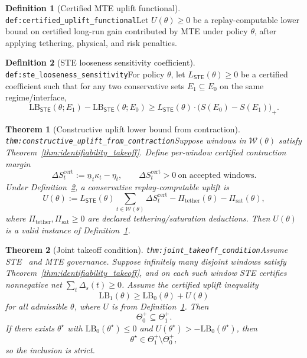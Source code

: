 \documentclass[11pt]{article}
\theoremstyle{definition}
\newtheorem{definition}{Definition}
\theoremstyle{plain}
\newtheorem{theorem}{Theorem}
\newcommand{\STE}{\textsf{STE}}
\newcommand{\MTE}{\textsf{MTE}}
\newcommand{\lbl}[1]{\texttt{\footnotesize\nolinkurl{#1}}}
\newcommand{\DefLabel}[1]{\hfill{\small\lbl{#1}}}
\newcommand{\deltas}{\Delta_s}
\begin{document}
\begin{definition}[Certified MTE uplift functional]\DefLabel{def:certified_uplift_functional}\label{def:certified_uplift_functional}
Let $U(\theta)\ge 0$ be a replay-computable lower bound on certified long-run gain contributed by \MTE{} under policy $\theta$, after applying tethering, physical, and risk penalties.
\end{definition}

\begin{definition}[STE looseness sensitivity coefficient]\DefLabel{def:ste_looseness_sensitivity}\label{def:ste_looseness_sensitivity}
For policy $\theta$, let $L_{\STE}(\theta)\ge 0$ be a certified coefficient such that for any two conservative sets
$E_1\subseteq E_0$ on the same regime/interface,
\[
\mathrm{LB}_{\STE}(\theta;E_1)-\mathrm{LB}_{\STE}(\theta;E_0)\ge L_{\STE}(\theta)\cdot\big(S(E_0)-S(E_1)\big)_+.
\]
\end{definition}

\begin{theorem}[Constructive uplift lower bound from contraction]\DefLabel{thm:constructive_uplift_from_contraction}\label{thm:constructive_uplift_from_contraction}
Suppose windows in $\mathcal{W}(\theta)$ satisfy Theorem~\ref{thm:identifiability_takeoff}.
Define per-window certified contraction margin
\[
\Delta S_t^{\mathrm{cert}}:=\underline n_t\kappa_t-\eta_t,\qquad \Delta S_t^{\mathrm{cert}}>0\ \text{on accepted windows}.
\]
Under Definition~\ref{def:ste_looseness_sensitivity}, a conservative replay-computable uplift is
\[
U(\theta):=L_{\STE}(\theta)\sum_{t\in\mathcal{W}(\theta)}\Delta S_t^{\mathrm{cert}}-\Pi_{\mathrm{tether}}(\theta)-\Pi_{\mathrm{sat}}(\theta),
\]
where $\Pi_{\mathrm{tether}},\Pi_{\mathrm{sat}}\ge 0$ are declared tethering/saturation deductions.
Then $U(\theta)$ is a valid instance of Definition~\ref{def:certified_uplift_functional}.
\end{theorem}

\begin{theorem}[Joint takeoff condition]\DefLabel{thm:joint_takeoff_condition}\label{thm:joint_takeoff_condition}
Assume \STE{}~\cite{STE2026} and \MTE{} governance.
Suppose infinitely many disjoint windows satisfy Theorem~\ref{thm:identifiability_takeoff}, and on each such window \STE{} certifies nonnegative net $\sum_t\deltas(t)\ge 0$.
Assume the certified uplift inequality
\[
\mathrm{LB}_1(\theta)\ge \mathrm{LB}_0(\theta)+U(\theta)
\]
for all admissible $\theta$, where $U$ is from Definition~\ref{def:certified_uplift_functional}.
Then
\[
\Theta_0^{+}\subseteq \Theta_1^{+}.
\]
If there exists $\theta^\star$ with $\mathrm{LB}_0(\theta^\star)\le 0$ and $U(\theta^\star)>-\mathrm{LB}_0(\theta^\star)$, then
\[
\theta^\star\in \Theta_1^{+}\setminus\Theta_0^{+},
\]
so the inclusion is strict.
\end{theorem}
\end{document}
